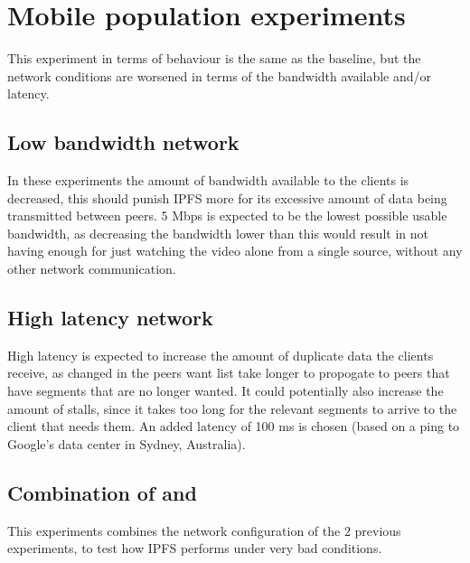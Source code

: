 \section{Mobile population experiments} %
This experiment in terms of behaviour is the same as the baseline, but the network conditions are worsened  in terms of the bandwidth available and/or latency. 

\subsection{Low bandwidth network} %
\label{sec:eval_low_bandwidth}
In these experiments the amount of bandwidth available to the clients is decreased, this should punish \ac{IPFS} more for its excessive amount of data being transmitted between peers. 5 \ac{Mbps} is expected to be the lowest possible usable bandwidth, as decreasing the bandwidth lower than this would result in not having enough for just watching the video alone from a single source, without any other network communication.

\subsection{High latency network} %
\label{sec:eval_high_latency}
High latency is expected to increase the amount of duplicate data the clients receive, as changed in the peers want list take longer to propogate to peers that have segments that are no longer wanted. It could potentially also increase the amount of stalls, since it takes too long for the relevant segments to arrive to the client that needs them. An added latency of 100 \acs{ms} is chosen (based on a ping to Google's data center in Sydney, Australia).

\subsection{Combination of  and }
This experiments combines the network configuration of the 2 previous experiments, to test how \ac{IPFS} performs under very bad conditions.



